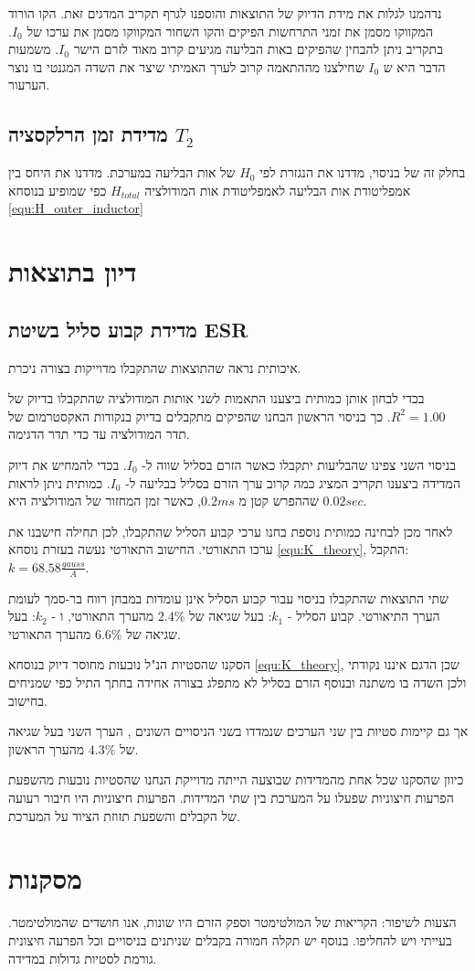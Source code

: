 \documentclass{article}
\begin{document}
נדהמנו לגלות את מידת הדיוק של התוצאות והוספנו לגרף תקריב המדגים זאת. הקו הורוד המקווקו מסמן את זמני התרחשות הפיקים והקו השחור המקווקו מסמן את ערכו של
$I_0$. בתקריב ניתן להבחין שהפיקים באות הבליעה מגיעים קרוב מאוד לזרם הישר
$I_0$.
משמעות הדבר היא ש
$I_0$
שחילצנו מההתאמה 
קרוב לערך האמיתי שיצר את השדה המגנטי בו נוצר הערעור.

\subsection{
מדידת זמן הרלקסציה
$T_2$
}

בחלק זה של בניסוי, מדדנו את הנגזרת לפי
$H_0$
של אות הבליעה במערכת.
מדדנו את היחס בין אמפליטודת אות הבליעה
לאמפליטודת אות המודולציה
$H_{total}$
כפי שמופיע בנוסחא
\ref{equ:H_outer_inductor}
\clearpage  
\section{דיון בתוצאות}
\subsection{מדידת קבוע סליל בשיטת ESR}
איכותית נראה שהתוצאות שהתקבלו מדוייקות בצורה ניכרת.

בכדי לבחון אותן כמותית
ביצענו התאמות לשני אותות המודולציה שהתקבלו בדיוק של
$R^2 = 1.00$.
כך בניסוי הראשון הבחנו 
שהפיקים מתקבלים בדיוק בנקודות האקסטרמום של תדר המודולציה עד כדי תדר הדגימה.


בניסוי השני צפינו שהבליעות יתקבלו כאשר הזרם בסליל  שווה ל- 
$I_0$.
בכדי להמחיש את דיוק המדידה ביצענו תקריב המציג כמה קרוב ערך הזרם בסליל בבליעה ל-
$I_0$.
כמותית ניתן לראות שההפרש קטן מ
$0.2 ms$,
כאשר זמן המחזור של המודולציה היא
$0.02 sec$.


לאחר מכן לבחינה כמותית נוספת בחנו ערכי קבוע הסליל שהתקבלו, לכן תחילה חישבנו את ערכו התאורטי. החישוב התאורטי נעשה בעזרת נוסחא 
\ref{equ:K_theory},
התקבל:
$k = 68.58 \frac{gauss}{A}$.

שתי התוצאות שהתקבלו בניסוי עבור קבוע הסליל אינן עומדות במבחן רווח בר-סמך לעומת הערך התיאורטי.
קבוע הסליל -
$k_1$:
בעל שגיאה של
$2.4\%$
מהערך התאורטי,
ו -
$k_2$:
בעל שגיאה של
$6.6\%$
מהערך התאורטי.

הסקנו שהסטיות הנ"ל נובעות מחוסר דיוק בנוסחא 
\ref{equ:K_theory},
שכן הדגם איננו נקודתי ולכן השדה בו משתנה ובנוסף הזרם בסליל לא מתפלג בצורה אחידה בחתך התיל כפי שמניחים בחישוב.

אך גם קיימות סטיות בין שני הערכים שנמדדו בשני הניסויים השונים , הערך השני בעל שגיאה של 
$4.3\%$
מהערך הראשון.
 
כיוון שהסקנו שכל אחת מהמדידות שבוצעה הייתה מדוייקת הנחנו שהסטיות נובעות מהשפעת הפרעות חיצוניות שפעלו על המערכת בין שתי המדידות.
הפרעות חיצוניות היו חיבור רעועה של הקבלים והשפעת תזוזת הציוד על המערכת.
\section{מסקנות}
.הצעות לשיפור: הקריאות של המולטימטר וספק הזרם היו שונות, אנו חושדים שהמולטימטר בעייתי ויש להחליפו.
בנוסף יש תקלה חמורה בקבלים שניתנים בניסויים וכל הפרעה חיצונית גורמת לסטיות גדולות במדידה.
\end{document}
